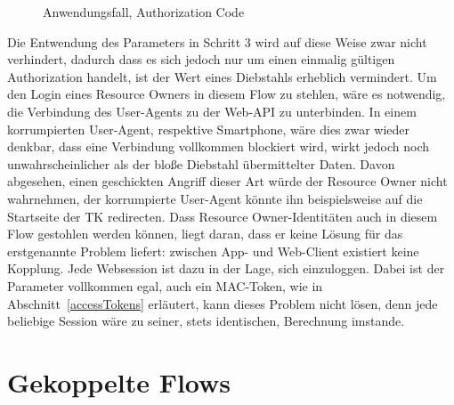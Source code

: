 \begin{figure}[h]
    \scalebox{.5}{
        
    }
    \caption{Anwendungsfall, Authorization Code}\label{ls: Authorization Code TK}
\end{figure} \noindent
Die Entwendung des Parameters in Schritt 3 wird auf diese Weise zwar nicht
verhindert, dadurch dass es sich jedoch nur um einen einmalig gültigen
Authorization handelt, ist der Wert eines Diebstahls erheblich vermindert.
Um den Login eines Resource Owners in diesem Flow zu stehlen, wäre es notwendig,
die Verbindung des User-Agents zu der Web-API zu unterbinden. In einem
korrumpierten User-Agent, respektive Smartphone, wäre dies zwar wieder denkbar,
dass eine Verbindung vollkommen blockiert wird, wirkt jedoch noch
unwahrscheinlicher als der bloße Diebstahl übermittelter Daten. Davon abgesehen,
einen geschickten Angriff dieser Art würde der Resource Owner nicht wahrnehmen,
der korrumpierte User-Agent könnte ihn beispielsweise auf die Startseite der TK
redirecten. Dass Resource Owner-Identitäten auch in diesem Flow gestohlen werden
können, liegt daran, dass er keine Lösung für das erstgenannte Problem liefert:
zwischen App- und Web-Client existiert keine Kopplung. Jede Websession ist
dazu in der Lage, sich einzuloggen. Dabei ist der Parameter vollkommen egal,
auch ein MAC-Token, wie in Abschnitt~\ref{accessTokens} erläutert, kann dieses
Problem nicht lösen, denn jede beliebige Session wäre zu seiner, stets
identischen, Berechnung imstande.
\\

\section{Gekoppelte Flows}

